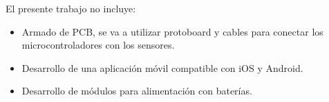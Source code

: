 El presente trabajo no incluye:
\begin{itemize}
	\item Armado de PCB, se va a utilizar protoboard y cables para conectar los microcontroladores con los sensores.
	\item Desarrollo de una aplicación móvil compatible con iOS y Android.
	\item Desarrollo de módulos para alimentación con baterías.
\end{itemize}